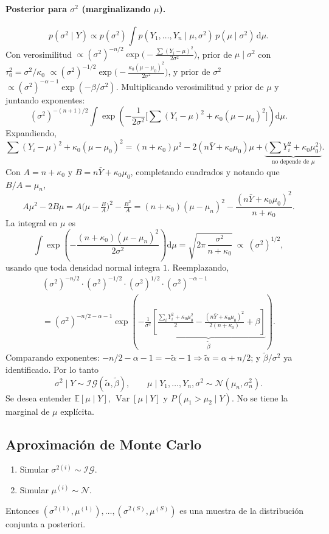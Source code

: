 \documentclass[11pt]{article}
\newcommand{\N}{\mathcal{N}}
\newcommand{\IG}{\mathcal{IG}}
\newcommand{\E}{\mathbb{E}}
\newcommand{\Var}{\operatorname{Var}}
\newcommand{\dpar}{\mathrm{d}}
\theoremstyle{definition}
\begin{document}
\paragraph{Posterior para $\sigma^2$ (marginalizando $\mu$).}
\[
p(\sigma^2\mid Y)\propto p(\sigma^2)\int p(Y_1,\dots,Y_n\mid\mu,\sigma^2)\,p(\mu\mid\sigma^2)\,\dpar\mu.
\]
Con verosimilitud $\propto(\sigma^2)^{-n/2}\exp\!\big(-\tfrac{\sum(Y_i-\mu)^2}{2\sigma^2}\big)$, prior de $\mu\mid\sigma^2$ con $\tau_0^2=\sigma^2/\kappa_0$ $\propto(\sigma^2)^{-1/2}\exp\!\big(-\tfrac{\kappa_0(\mu-\mu_0)^2}{2\sigma^2}\big)$, y prior de $\sigma^2$ $\propto(\sigma^2)^{-\alpha-1}\exp(-\beta/\sigma^2)$. Multiplicando verosimilitud y prior de $\mu$ y juntando exponentes:
\[
(\sigma^2)^{-(n+1)/2}\int\exp\!\left(-\frac{1}{2\sigma^2}\Big[\sum(Y_i-\mu)^2+\kappa_0(\mu-\mu_0)^2\Big]\right)\dpar\mu.
\]
Expandiendo,
\[
\sum(Y_i-\mu)^2+\kappa_0(\mu-\mu_0)^2=(n+\kappa_0)\mu^2-2(n\bar Y+\kappa_0\mu_0)\mu+\underbrace{\big(\textstyle\sum Y_i^2+\kappa_0\mu_0^2\big)}_{\text{no depende de }\mu}.
\]
Con $A=n+\kappa_0$ y $B=n\bar Y+\kappa_0\mu_0$, completando cuadrados y notando que $B/A=\mu_n$,
\[
A\mu^2-2B\mu=A\Big(\mu-\tfrac{B}{A}\Big)^2-\tfrac{B^2}{A}=(n+\kappa_0)(\mu-\mu_n)^2-\frac{(n\bar Y+\kappa_0\mu_0)^2}{n+\kappa_0}.
\]
La integral en $\mu$ es
\[
\int\exp\!\left(-\frac{(n+\kappa_0)(\mu-\mu_n)^2}{2\sigma^2}\right)\dpar\mu=\sqrt{2\pi\,\frac{\sigma^2}{n+\kappa_0}}\ \propto\ (\sigma^2)^{1/2},
\]
usando que toda densidad normal integra $1$. Reemplazando,
\begin{multline*}
(\sigma^2)^{-n/2}\cdot(\sigma^2)^{-1/2}\cdot(\sigma^2)^{1/2}\cdot(\sigma^2)^{-\alpha-1}\\
=(\sigma^2)^{-n/2-\alpha-1}\exp\!\left(-\frac{1}{\sigma^2}\underbrace{\left[\frac{\sum_i Y_i^2+\kappa_0\mu_0^2}{2}-\frac{(n\bar Y+\kappa_0\mu_0)^2}{2(n+\kappa_0)}+\beta\right]}_{\tilde\beta}\right).
\end{multline*}
Comparando exponentes: $-n/2-\alpha-1=-\tilde\alpha-1\Rightarrow\tilde\alpha=\alpha+n/2$; y $\tilde\beta/\sigma^2$ ya identificado. Por lo tanto
\[
\sigma^2\mid Y\sim\IG(\tilde\alpha,\tilde\beta),\qquad
\mu\mid Y_1,\dots,Y_n,\sigma^2\sim\N(\mu_n,\sigma_n^2).
\]
Se desea entender $\E[\mu\mid Y]$, $\Var[\mu\mid Y]$ y $P(\mu_1>\mu_2\mid Y)$. No se tiene la marginal de $\mu$ explícita.

\subsection{Aproximación de Monte Carlo}
\begin{enumerate}[leftmargin=2em]
  \item Simular $\sigma^{2(i)}\sim\IG$.
  \item Simular $\mu^{(i)}\sim\N$.
\end{enumerate}
Entonces $(\sigma^{2(1)},\mu^{(1)}),\dots,(\sigma^{2(S)},\mu^{(S)})$ es una muestra de la distribución conjunta a posteriori.
\end{document}
